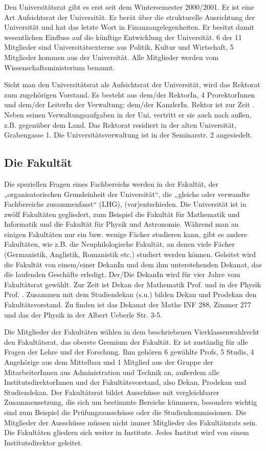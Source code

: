 Den Universitätsrat gibt es erst seit dem Wintersemester 2000/2001. Er ist
eine Art Aufsichtsrat der Universität. Er berät über die strukturelle
Ausrichtung der Universität und hat das letzte Wort in
Finanzangelegenheiten. Er besitzt damit wesentlichen Einfluss auf die
künftige Entwicklung der Universität. 6 der 11 Mitglieder sind
Universitätsexterne aus Politik, Kultur und Wirtschaft, 5 Mitglieder
kommen aus der Universität. Alle Mitglieder werden vom
Wissenschaftsministerium benannt.

Sieht man den Universitätsrat als Aufsichtsrat der Universität, wird das
Rektorat zum zugehörigen Vorstand. Es besteht aus dem/der RektorIn, 4
ProrektorInnen und dem/der LeiterIn der Verwaltung: dem/der KanzlerIn.
Rektor ist zur Zeit \rektor . Neben seinen Verwaltungsaufgaben in
der Uni, vertritt er sie auch nach außen, z.B. gegenüber dem Land. Das
Rektorat residiert in der alten Universität, Grabengasse 1. Die
Universitätsverwaltung ist in der Seminarstr. 2 angesiedelt.

\subsection{Die Fakultät}

Die speziellen Fragen eines Fachbereichs werden in der Fakultät, der
„organisatorischen Grundeinheit der Universität“, die „gleiche oder
verwandte Fachbereiche zusammenfasst“ (LHG), (vor)entschieden. Die
Universität ist in zwölf Fakultäten gegliedert, zum Beispiel die Fakultät für
Mathematik und Informatik und die Fakultät für Physik und Astronomie.
Während man an einigen Fakultäten nur ein bzw. wenige Fächer studieren
kann, gibt es andere Fakultäten, wie z.B. die Neuphilologische Fakultät,
an denen viele Fächer (Germanistik, Anglistik, Romanistik etc.) studiert
werden können. Geleitet wird die Fakultät von einem/einer DekanIn und dem
ihm unterstehenden Dekanat, das die laufenden Geschäfte erledigt. Der/Die
DekanIn wird für vier Jahre vom Fakultätsrat gewählt. Zur Zeit ist Dekan der
Mathematik Prof. \dekanmathe{} und in der Physik Prof. \dekanphysik. Zusammen mit dem
Studiendekan (s.u.) bilden Dekan und Prodekan den Fakultätsvorstand. Zu
finden ist das Dekanat der Mathe \gls{INF} 288, Zimmer 277 und das der Physik
in der Albert Ueberle Str. 3-5.

Die Mitglieder der Fakultäten wählen in dem beschriebenen
Vierklassenwahlrecht den Fakultätsrat, das oberste Gremium der Fakultät.
Er ist zuständig für alle Fragen der Lehre und der Forschung. Ihm gehören
6 gewählte Profs, 5 Studis, 4 Angehörige aus dem Mittelbau und 1 Mitglied
aus der Gruppe der MitarbeiterInnen aus Administration und Technik
an, außerdem alle InstitutsdirektorInnen und der Fakultätsvorstand, also Dekan,
Prodekan und Studiendekan. Der Fakultätsrat bildet Ausschüsse mit vergleichbarer
Zusammensetzung, die sich um bestimmte Bereiche kümmern, besonders wichtig
sind zum Beispiel die Prüfungsausschüsse oder die Studienkommissionen. Die
Mitglieder der Ausschüsse müssen nicht immer Mitglieder des Fakultätsrats
sein. Die Fakultäten gliedern sich weiter in Institute. Jedes Institut
wird von einem Institutsdirektor geleitet.

